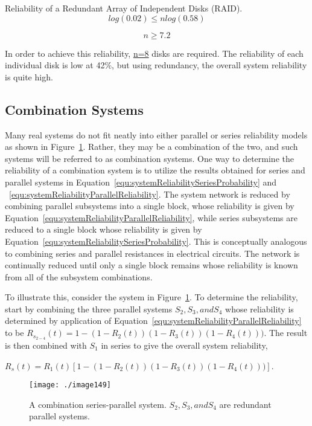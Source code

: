 {\begin{example}{Reliability of a Redundant Array of Independent Disks (RAID).}
$$log(0.02) \leq nlog(0.58)$$

$$n \geq 7.2$$
\end{example}

In order to achieve this reliability, \ul{n=8} disks are required. The
reliability of each individual disk is low at 42\%, but using
redundancy, the overall system reliability is quite high.

\subsection{Combination Systems}
\label{subsection:combination-systems}

Many real systems do not fit neatly into either parallel or series
reliability models as shown in Figure~\ref{figure:systemReliabilitySeriesParallel}. 
Rather, they may be a
combination of the two, and such systems will be referred to as
combination systems. One way to determine the reliability of a
combination system is to utilize the results obtained for series and
parallel systems in 
Equation~\ref{equ:systemReliabilitySeriesProbability}
 and ~\ref{equ:systemReliabilityParallelReliability}. The 
 system network is reduced by
combining parallel subsystems into a single block, whose reliability is
given by 
Equation~\ref{equ:systemReliabilityParallelReliability}, while series 
subsystems are reduced to a single block
whose reliability is given by 
Equation~\ref{equ:systemReliabilitySeriesProbability}. This is conceptually analogous to
combining series and parallel resistances in electrical circuits. The
network is continually reduced until only a single block remains whose
reliability is known from all of the subsystem combinations.

To illustrate this, consider the system in 
Figure~\ref{figure:systemReliabilitySeriesParallel}. To determine the
reliability, start by combining the three parallel systems
$S_2, S_3, and S_4$ whose
reliability is determined by application of 
Equation~\ref{equ:systemReliabilityParallelReliability} to be 
$R_{s_{2-4}}(t) = 1- (1-R_2(t))(1-R_3(t))(1-R_4(t)))$.
The result is then combined with $S_1$ in series to give the
overall system reliability, 

$R_{s}(t) = R_1(t) \left[ 1- (1-R_2(t))(1-R_3(t))(1-R_4(t))) \right]$.


\begin{figure}[h]
\centering
\texttt{[image: ./image149]}
\caption{A combination series-parallel system. $S_2, S_3, and S_4$
are redundant parallel systems.}
\label{figure:systemReliabilitySeriesParallel}
\end{figure}


}

